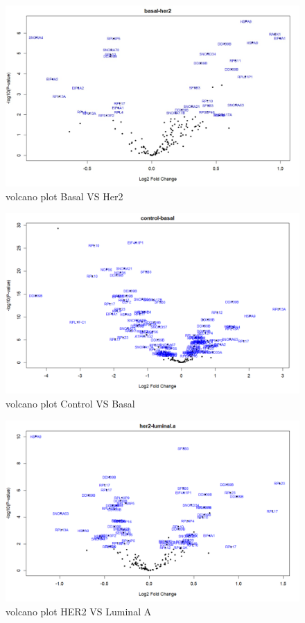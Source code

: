 \documentclass[journal]{IEEEtran}
\begin{document}
\begin{figure}[!ht]
    \centering
    \includegraphics[width=.8\textwidth]{images/DE/volcano1DE.jpg}
    \caption{volcano plot Basal VS Her2}
    \label{fig:volcano1DE_copy}
\end{figure}

\begin{figure}
    \centering
    \includegraphics[width=.8\textwidth]{images/DE/volcano2DE.jpg}
    \caption{volcano plot Control VS Basal}
    \label{fig:volcano2DE}
\end{figure}

\begin{figure}
    \centering
    \includegraphics[width=.8\textwidth]{images/DE/volcano3DE.jpg}
    \caption{volcano plot HER2 VS Luminal A}
    \label{fig:volcano3DE}
\end{figure}
\end{document}
